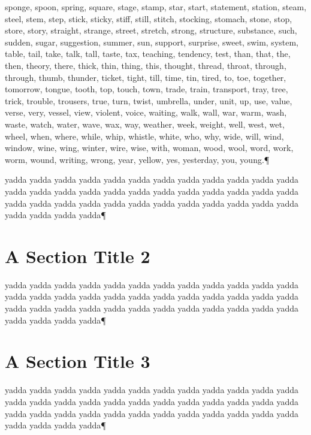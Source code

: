 sponge, spoon, spring, square, stage, stamp, star, start, statement, station,
steam, steel, stem, step, stick, sticky, stiff, still, stitch, stocking,
stomach, stone, stop, store, story, straight, strange, street, stretch,
strong, structure, substance, such, sudden, sugar, suggestion, summer, sun,
support, surprise, sweet, swim, system, table, tail, take, talk, tall, taste,
tax, teaching, tendency, test, than, that, the, then, theory, there, thick,
thin, thing, this, thought, thread, throat, through, through, thumb, thunder,
ticket, tight, till, time, tin, tired, to, toe, together, tomorrow, tongue,
tooth, top, touch, town, trade, train, transport, tray, tree, trick, trouble,
trousers, true, turn, twist, umbrella, under, unit, up, use, value, verse,
very, vessel, view, violent, voice, waiting, walk, wall, war, warm, wash,
waste, watch, water, wave, wax, way, weather, week, weight, well, west, wet,
wheel, when, where, while, whip, whistle, white, who, why, wide, will, wind,
window, wine, wing, winter, wire, wise, with, woman, wood, wool, word, work,
worm, wound, writing, wrong, year, yellow, yes, yesterday, you, young.¶\par
yadda yadda yadda yadda yadda yadda yadda yadda yadda yadda
yadda yadda yadda yadda yadda yadda yadda yadda yadda yadda
yadda yadda yadda yadda yadda yadda yadda yadda yadda yadda
yadda yadda yadda yadda yadda yadda yadda yadda yadda yadda¶\par

\section{A Section Title 2 
}
yadda yadda yadda yadda yadda yadda yadda yadda yadda yadda
yadda yadda yadda yadda yadda yadda yadda yadda yadda yadda
yadda yadda yadda yadda yadda yadda yadda yadda yadda yadda
yadda yadda yadda yadda yadda yadda yadda yadda yadda yadda¶\par

\section{A Section Title 3 
}
yadda yadda yadda yadda yadda yadda yadda yadda yadda yadda
yadda yadda yadda yadda yadda yadda yadda yadda yadda yadda
yadda yadda yadda yadda yadda yadda yadda yadda yadda yadda
yadda yadda yadda yadda yadda yadda yadda yadda yadda yadda¶\par

